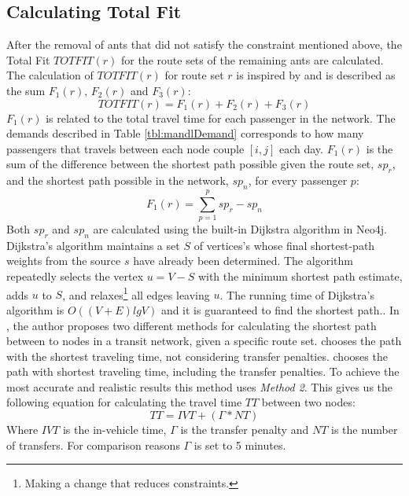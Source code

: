 \subsection{Calculating Total Fit}
After the removal of ants that did not satisfy the constraint mentioned above, the Total Fit $TOTFIT(r)$ for the route sets of the remaining ants are calculated. The calculation of $TOTFIT(r)$ for route set $r$ is inspired by \citep{kechagiopoulos14} and is described as the sum $F_{1}(r)$, $F_{2}(r)$ and $F_{3}(r)$: 
\newline
$$ TOTFIT(r) = F_{1}(r) + F_{2}(r) + F_{3}(r)$$
\newline
$F_{1}(r)$ is related to the total travel time for each passenger in the network. The demands described in Table \vref{tbl:mandlDemand} corresponds to how many passengers that travels between each node couple $[i,j]$ each day. $F_{1}(r)$ is the sum of the difference between the shortest path possible given the route set, $sp_r$, and the shortest path possible in the network, $sp_n$, for every passenger $p$:
\newline
$$F_{1}(r) = \sum\limits^{p}_{p=1}sp_r-sp_n$$
\newline
Both $sp_r$ and $sp_n$ are calculated using the built-in Dijkstra algorithm in Neo4j. Dijkstra's algorithm \cite[p.658-662]{cormen09} maintains a set $S$ of vertices's whose final shortest-path weights from the source $s$ have already been determined. The algorithm repeatedly selects the vertex $u = V - S$ with the minimum shortest path estimate, adds $u$ to $S$, and relaxes\footnote{Making a change that reduces constraints.} all edges leaving $u$. The running time of Dijkstra's algorithm is $O((V + E)lg V)$ and it is guaranteed to find the shortest path.\cite[p.~661]{cormen09}. In \citep{mandl79}, the author proposes two different methods for calculating the shortest path between to nodes in a transit network, given a specific route set.  chooses the path with the shortest traveling time, not considering transfer penalties.  chooses the path with shortest traveling time, including the transfer penalties. To achieve the most accurate and realistic results this method uses \textit{Method 2}. This gives us the following equation for calculating the travel time $TT$ between two nodes: 
\newline
$$TT = IVT + (\Gamma*NT)$$
\newline
Where $IVT$ is the in-vehicle time, $\Gamma$ is the transfer penalty and $NT$ is the number of transfers. For comparison reasons $\Gamma$ is set to 5 minutes. 

